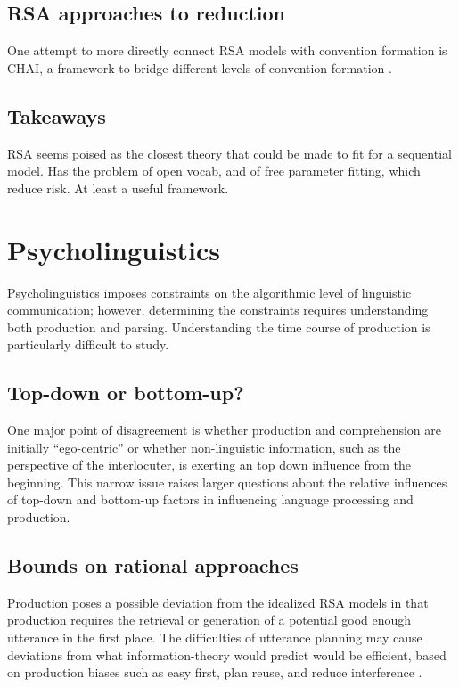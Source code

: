 \documentclass[]{article}
\begin{document}
\subsection{RSA approaches to reduction}
One attempt to more directly connect RSA models with convention formation is CHAI, a framework to bridge different levels of convention formation \cite{hawkins2021}. 

\subsection{Takeaways}
RSA seems poised as the closest theory that could be made to fit for a sequential model. Has the problem of open vocab, and of free parameter fitting, which reduce risk. At least a useful framework. 

\section{Psycholinguistics}

Psycholinguistics imposes constraints on the algorithmic level of linguistic communication; however, determining the constraints requires understanding both production and parsing. Understanding the time course of production is particularly difficult to study. 

\subsection{Top-down or bottom-up?}
One major point of disagreement is whether production and comprehension are initially ``ego-centric'' or whether non-linguistic information, such as the perspective of the interlocuter, is exerting an top down influence from the beginning. This narrow issue raises larger questions about the relative influences of top-down and bottom-up factors in influencing language processing and production.

\subsection{Bounds on rational approaches}
Production poses a possible deviation from the idealized RSA models in that production requires the retrieval or generation of a potential good enough utterance in the first place. The difficulties of utterance planning may cause deviations from what information-theory would predict would be efficient, based on production biases such as easy first, plan reuse, and reduce interference \cite{macdonald2013}. 
\end{document}
